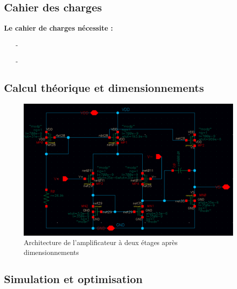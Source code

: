 \documentclass[11pt]{article}
\begin{document}
\subsection{Cahier des charges}

\textbf{Le cahier de charges n\'ecessite :}
\begin{itemize} \itemsep -2pt
  \item[-]
  \item[-]
\end{itemize}

\subsection{Calcul th\'eorique et dimensionnements}

\begin{figure}[!htb]
\begin{center}
  \includegraphics[width=\linewidth]{amplificateur_.png}
  \caption{Architecture de l'amplificateur \`a deux \'etages apr\`es dimensionnements}
\end{center}
\end{figure}

\clearpage

\subsection{Simulation et optimisation}
\end{document}
